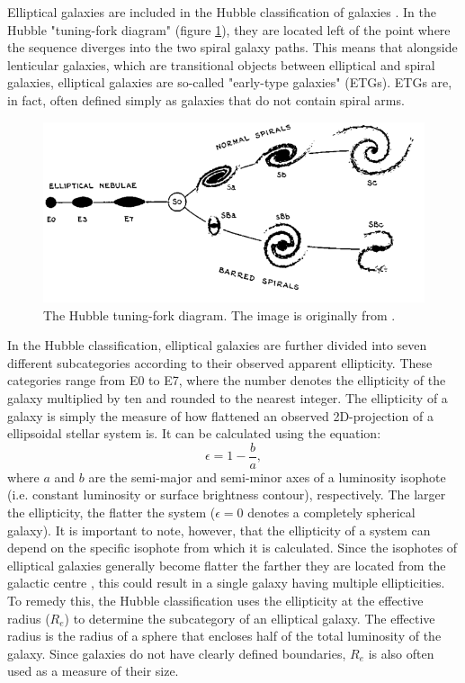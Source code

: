 \documentclass[english, oneside]{HYgradu}
\begin{document}
Elliptical galaxies are included in the Hubble classification of galaxies \citep{Hubble1926}. In the Hubble "tuning-fork diagram" (figure \ref{figure:tuning_fork}), they are located left of the point where the sequence diverges into the two spiral galaxy paths. This means that alongside lenticular galaxies, which are transitional objects between elliptical and spiral galaxies, elliptical galaxies are so-called "early-type galaxies" (ETGs). ETGs are, in fact, often defined simply as galaxies that do not contain spiral arms.

\begin{figure}
	\centering
	\includegraphics[width=\textwidth]{TuningForkHubble.png}
	\caption{The Hubble tuning-fork diagram. The image is originally from \cite{Hubble1936}.}
	\label{figure:tuning_fork}
\end{figure}

In the Hubble classification, elliptical galaxies are further divided into seven different subcategories according to their observed apparent ellipticity. These categories range from E0 to E7, where the number denotes the ellipticity of the galaxy multiplied by ten and rounded to the nearest integer. The ellipticity of a galaxy is simply the measure of how flattened an observed 2D-projection of a ellipsoidal stellar system is. It can be calculated using the equation:
\begin{equation}
\epsilon = 1 - \frac{b}{a},
\end{equation}
where $a$ and $b$ are the semi-major and semi-minor axes of a luminosity isophote (i.e. constant luminosity or surface brightness contour), respectively. The larger the ellipticity, the flatter the system ($\epsilon = 0$ denotes a completely spherical galaxy). It is important to note, however, that the ellipticity of a system can depend on the specific isophote from which it is calculated. Since the isophotes of elliptical galaxies generally become flatter the farther they are located from the galactic centre \citep{BinneyTremaine}, this could result in a single galaxy having multiple ellipticities. To remedy this, the Hubble classification uses the ellipticity at the effective radius ($R_e$) to determine the subcategory of an elliptical galaxy. The effective radius is the radius of a sphere that encloses half of the total luminosity of the galaxy. Since galaxies do not have clearly defined boundaries, $R_e$ is also often used as a measure of their size. 
\end{document}

